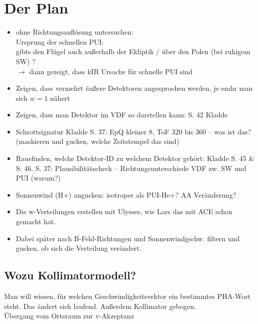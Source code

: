 \documentclass[]{article}
\begin{document}
\section{Der Plan}
	\begin{itemize}
		\item ohne Richtungsauflösung untersuchen: \\
			Ursprung der schnellen PUI: \\
			gibts den Flügel auch außerhalb der Ekliptik / über den Polen (bei ruhigem SW) ?\\
			$\rightarrow$ dann gezeigt, dass kIR Ursache für schnelle PUI sind
		\item Zeigen, dass vermehrt äußere Detektoren angesprochen werden, je emhr man sich $w = 1$ nähert
		\item Zeigen, dass man Detektor im VDF so darstellen kann: S. 42 Kladde
		\item Schrottsignatur Kladde S. 37: EpQ kleiner 8, ToF 320 bis 360 -- was ist das? (maskieren und gucken, welche Zeitstempel das sind)
		\item Rausfinden, welche Detektor-ID zu welchem Detektor gehört: Kladde S. 45 \& S. 46. S. 37: Plausibilitätscheck -- Richtungsunterschiede VDF zw. SW und PUI (warum?)
		\item Sonnenwind (H+) angucken: isotroper als PUI-He+? AA Veränderung?
		\item Die w-Verteilungen erstellen mit Ulysses, wie Lars das mit ACE schon gemacht hat.
		\item Dabei später nach B-Feld-Richtungen und Sonnenwindgschw. filtern und gucken, ob sich die Verteilung verändert. 
	\end{itemize}
\subsection{Wozu Kollimatormodell?}
Man will wissen, für welchen Geschwindigkeitsvektor ein bestimmtes PHA-Wort steht. Das ändert sich laufend. Außerdem Kollimator gebogen. \\ 
Übergang vom Ortsraum zur v-Akzeptanz
\end{document}
